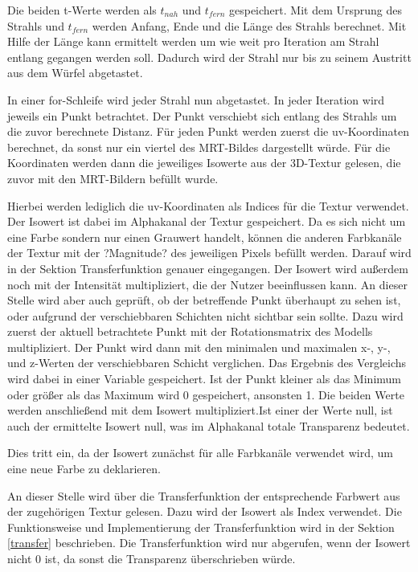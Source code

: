 Die beiden t-Werte werden als $t_{nah}$ und $t_{fern}$ gespeichert.
Mit dem Ursprung des Strahls und $t_{fern}$ werden Anfang, Ende und die Länge des Strahls berechnet. Mit Hilfe der Länge kann ermittelt werden um wie weit pro Iteration am Strahl entlang gegangen werden soll. Dadurch wird der Strahl nur bis zu seinem Austritt aus dem Würfel abgetastet. 

In einer for-Schleife wird jeder Strahl nun abgetastet. In jeder Iteration wird jeweils ein Punkt betrachtet. Der Punkt verschiebt sich entlang des Strahls um die zuvor berechnete Distanz.
Für jeden Punkt werden zuerst die uv-Koordinaten berechnet, da sonst nur ein viertel des MRT-Bildes dargestellt würde.
Für die Koordinaten werden dann die jeweiliges Isowerte aus der 3D-Textur gelesen, die zuvor mit den MRT-Bildern befüllt wurde.

Hierbei werden lediglich die uv-Koordinaten als Indices für die Textur verwendet. 
Der Isowert ist dabei im Alphakanal der Textur gespeichert. Da es sich nicht um eine Farbe sondern nur einen Grauwert handelt, können die anderen Farbkanäle der Textur mit der ?Magnitude? des jeweiligen Pixels befüllt werden. Darauf wird in der Sektion Transferfunktion genauer eingegangen.
Der Isowert wird außerdem noch mit der Intensität multipliziert, die der Nutzer beeinflussen kann.
An dieser Stelle wird aber auch geprüft, ob der betreffende Punkt überhaupt zu sehen ist, oder aufgrund der verschiebbaren Schichten nicht sichtbar sein sollte. 
Dazu wird zuerst der aktuell betrachtete Punkt mit der Rotationsmatrix des Modells multipliziert.
Der Punkt wird dann mit den minimalen und maximalen x-, y-, und z-Werten der verschiebbaren Schicht verglichen. Das Ergebnis des Vergleichs wird dabei in einer Variable gespeichert. Ist der Punkt kleiner als das Minimum oder größer als das Maximum wird 0 gespeichert, ansonsten 1. 
Die beiden Werte werden anschließend mit dem Isowert multipliziert.Ist einer der Werte null, ist auch der ermittelte Isowert null, was im Alphakanal totale Transparenz bedeutet. 


Dies tritt ein, da der Isowert zunächst für alle Farbkanäle verwendet wird, um eine neue Farbe zu deklarieren.

An dieser Stelle wird über die Transferfunktion der entsprechende Farbwert aus der zugehörigen Textur gelesen. Dazu wird der Isowert als Index verwendet. Die Funktionsweise und Implementierung der Transferfunktion wird in der Sektion \ref{transfer} beschrieben.
Die Transferfunktion wird nur abgerufen, wenn der Isowert nicht 0 ist, da sonst die Transparenz überschrieben würde.

